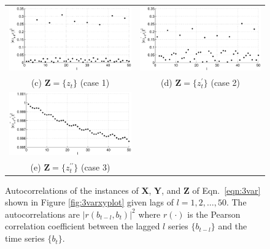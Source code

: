 {\begin{center}
\begin{figure}[h]
\begin{tabular}{cc}
\includegraphics[scale=0.35]{NoisyMultiResponseExample_autocorrZ1.eps} & \includegraphics[scale=0.35]{NoisyMultiResponseExample_autocorrZ2.eps} \\
(c) $\mathbf{Z} = \{z_t\}$ (case 1)& (d) $\mathbf{Z} = \{z_t^\prime\}$ (case 2)\\
\includegraphics[scale=0.35]{NoisyMultiResponseExample_autocorrZ3.eps} &  \\
(e) $\mathbf{Z} = \{z_t^{\prime\prime}\}$ (case 3)& 
\end{tabular}
\caption[Autocorrelations of the instances]{Autocorrelations of the instances of $\mathbf{X}$, $\mathbf{Y}$, and $\mathbf{Z}$ of Eqn.\ \ref{eqn:3var} shown in Figure \ref{fig:3varxyplot} given lags of $l=1,2,\ldots,50$.  The autocorrelations are $|r(b_{t-l},b_t)|^2$ where $r(\cdot)$ is the Pearson correlation coefficient between the lagged $l$ series $\{b_{t-l}\}$ and the time series $\{b_{t}\}$.}
\label{fig:3varxyautocorr}
\end{figure}
\end{center}
\vspace*{\fill}
}
